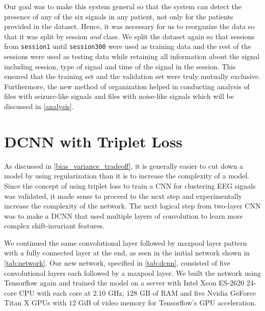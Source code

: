 Our goal was to make this system general so that the system can detect the presence of any of the six signals in any patient, not only for the patients provided in the dataset. Hence, it was necessary for us to reorganize the data so that it was split by session \textit{and} class. We split the dataset again so that sessions from \verb+session1+ until \verb+session300+ were used as training data and the rest of the sessions were used as testing data while retaining all information about the signal including session, type of signal and time of the signal in the session. This ensured that the training set and the validation set were truly mutually exclusive. Furthermore, the new method of organization helped in conducting analysis of files with seizure-like signals and files with noise-like signals which will be discussed in \cref{analysis}.

\section{DCNN with Triplet Loss}

As discussed in \cref{bias_variance_tradeoff}, it is generally easier to cut down a model by using regularization than it is to increase the complexity of a model. Since the concept of using triplet loss to train a CNN for clustering EEG signals was validated, it made sense to proceed to the next step and experimentally increase the complexity of the network. The next logical step from two-layer CNN was to make a DCNN that used multiple layers of convolution to learn more complex shift-invariant features.

We continued the same convolutional layer followed by maxpool layer pattern with a fully connected layer at the end, as seen in the initial network shown in \cref{tab:network}. Our new network, specified in \cref{tab:dcnn}, consisted of five convolutional layers each followed by a maxpool layer. We built the network using Tensorflow again and trained the model on a server with Intel Xeon ES-2620 24-core CPU with each core at $2.10$ GHz, $128$ GB of RAM and five Nvidia GeForce Titan X GPUs with $12$ GiB of video memory for Tensorflow's GPU acceleration.


